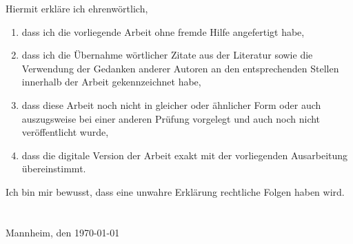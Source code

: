 
    Hiermit erkläre ich ehrenwörtlich,
    \begin{enumerate}
      \item dass ich die vorliegende Arbeit ohne fremde Hilfe angefertigt habe,
      \item dass ich die Übernahme wörtlicher Zitate aus der Literatur sowie die Verwendung der Gedanken anderer Autoren an den entsprechenden Stellen innerhalb der Arbeit gekennzeichnet habe,
      \item dass diese Arbeit noch nicht in gleicher oder ähnlicher Form oder auch auszugsweise bei einer anderen Prüfung vorgelegt und auch noch nicht veröffentlicht wurde,
      \item dass die digitale Version der Arbeit exakt mit der vorliegenden Ausarbeitung übereinstimmt.
    \end{enumerate}

    Ich bin mir bewusst, dass eine unwahre Erklärung rechtliche Folgen haben wird.
\\
\vspace{2cm}
\\
\noindent\verfasser
\\
\noindent Mannheim, den \today 